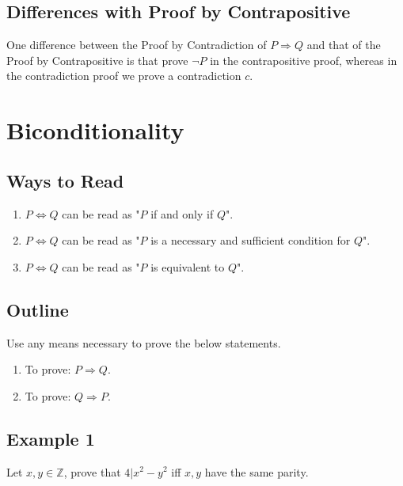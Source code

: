 \documentclass{article}
\begin{document}
\subsection*{Differences with Proof by Contrapositive}

One difference between the Proof by Contradiction of $P \Rightarrow Q$ and that of the Proof by Contrapositive is that prove $\lnot P$ in the contrapositive proof, whereas in the contradiction proof we prove a contradiction $c$.

\section*{Biconditionality}

\subsection*{Ways to Read}

\begin{enumerate}
    \item $P \Leftrightarrow Q$ can be read as "$P$ if and only if $Q$".
    \item $P \Leftrightarrow Q$ can be read as "$P$ is a necessary and sufficient condition for $Q$".
    \item $P \Leftrightarrow Q$ can be read as "$P$ is equivalent to $Q$".
\end{enumerate}

\subsection*{Outline}

Use any means necessary to prove the below statements.

\begin{enumerate}
    \item To prove: $P \Rightarrow Q$.
    \item To prove: $Q \Rightarrow P$.
\end{enumerate}

\subsection*{Example 1}

Let $x, y \in \mathbb{Z}$, prove that $4 | x^2-y^2$ iff $x, y$ have the same parity.
\end{document}

